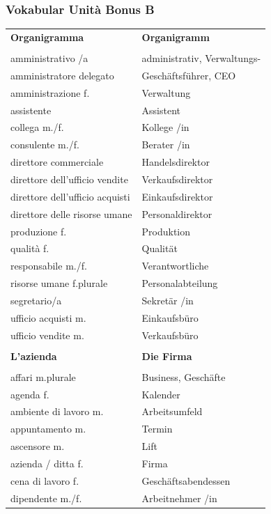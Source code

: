 \documentclass[10pt]{scrartcl}
\begin{document}
\begin{multicols*}{2}
\subsubsection*{Vokabular Unità Bonus B}
\begin{supertabular}{p{4cm}p{4cm}}
\textbf{Organigramma} & \textbf{Organigramm}\\
\\
amministrativo /a & administrativ, Verwaltungs-\\
amministratore delegato & Geschäftsführer, CEO\\
amministrazione \hfill f. & Verwaltung\\
assistente & Assistent\\
collega \hfill m./f. & Kollege /in\\
consulente \hfill m./f. & Berater /in\\
direttore commerciale & Handelsdirektor\\
direttore dell'ufficio vendite & Verkaufsdirektor\\
direttore dell'ufficio acquisti & Einkaufsdirektor\\
direttore delle risorse umane & Personaldirektor\\
produzione \hfill f. & Produktion\\
qualità \hfill f. & Qualität\\
responsabile \hfill m./f. & Verantwortliche\\
risorse umane \hfill f.plurale & Personalabteilung\\
segretario/a & Sekretär /in\\
ufficio acquisti \hfill m. & Einkaufsbüro\\
ufficio vendite \hfill m. & Verkaufsbüro\\
\\
\textbf{L'azienda} & \textbf{Die Firma}\\
\\
affari \hfill m.plurale & Business, Geschäfte\\
agenda \hfill f. & Kalender\\
ambiente di lavoro \hfill m. & Arbeitsumfeld\\
appuntamento \hfill m. & Termin\\
ascensore \hfill m. & Lift\\
azienda / ditta \hfill f. & Firma\\
cena di lavoro \hfill f. & Geschäftsabendessen\\
dipendente \hfill m./f. & Arbeitnehmer /in\\

\end{supertabular}
\end{multicols*}
\end{document}
